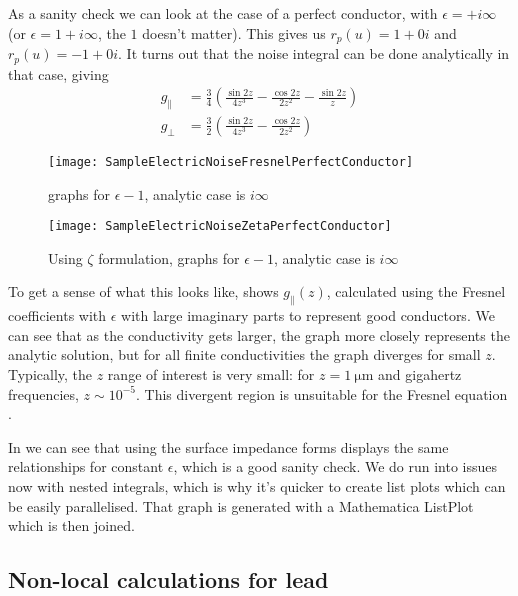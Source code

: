 \documentclass[../main.tex]{subfiles}
\begin{document}
	As a sanity check we can look at the case of a perfect conductor, with $\epsilon = + i \infty$ (or $\epsilon = 1 + i \infty$, the $1$ doesn't matter).
	This gives us $r_p(u) = 1 + 0 i$ and $r_p(u) = -1 + 0 i$.
	It turns out that the noise integral can be done analytically in that case, giving
	\begin{align}
		g_{\parallel} &= \frac{3}{4} \left(\frac{\sin{2 z}}{4 z^3} - \frac{\cos{2 z}}{2 z^2} - \frac{\sin{2 z}}{z}\right) \\
		g_{\perp} &= \frac32 \left( \frac{\sin{2 z}}{4 z^3} - \frac{\cos{2 z}}{2 z^2} \right)
	\end{align}

	\begin{figure}[htp]
		\centering
		\texttt{[image: SampleElectricNoiseFresnelPerfectConductor]}
		\caption{graphs for $\epsilon - 1$, analytic case is $i \infty$} \label{fig:SampleElectricNoiseFresnelPerfect}
	\end{figure}

	\begin{figure}[htp]
		\centering
		\texttt{[image: SampleElectricNoiseZetaPerfectConductor]}
		\caption{Using $\zeta$ formulation, graphs for $\epsilon - 1$, analytic case is $i \infty$} \label{fig:SampleElectricNoiseZetaPerfect}
	\end{figure}

	To get a sense of what this looks like,  shows $g_{\parallel}(z)$, calculated using the Fresnel coefficients with $\epsilon$ with large imaginary parts to represent good conductors.
	We can see that as the conductivity gets larger, the graph more closely represents the analytic solution, but for all finite conductivities the graph diverges for small $z$.
	Typically, the $z$ range of interest is very small: for $z = \SI{1}{\micro\meter}$ and gigahertz frequencies, $z \sim 10^{-5}$.
	This divergent region is unsuitable for the Fresnel equation .

	In  we can see that using the surface impedance forms displays the same relationships for constant $\epsilon$, which is a good sanity check.
	We do run into issues now with nested integrals, which is why it's quicker to create list plots which can be easily parallelised.
	That graph is generated with a Mathematica ListPlot which is then joined.

	\subsection{Non-local calculations for lead} \label{subsec:sample:namresult}
\end{document}

